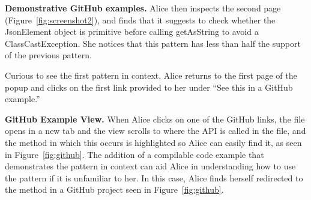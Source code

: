 {\bf Demonstrative GitHub examples.} Alice then inspects the second page (Figure~\ref{fig:screenshot2}), and finds that it suggests to check whether the {\ttt JsonElement} object is primitive before calling {\ttt getAsString} to avoid a {\ttt ClassCastException}. She notices that this pattern has less than half the support of the previous pattern.

Curious to see the first pattern in context, Alice returns to the first page of the popup and clicks on the first link provided to her under ``See this in a GitHub example.''



{\bf GitHub Example View.} When Alice clicks on one of the GitHub links, the file opens in a new tab and the view scrolls to where the API is called in the file, and the method in which this occurs is highlighted so Alice can easily find it, as seen in Figure~\ref{fig:github}. The addition of a compilable code example that demonstrates the pattern in context can aid Alice in understanding how to use the pattern if it is unfamiliar to her. In this case, Alice finds herself redirected to the method in a GitHub project seen in Figure~\ref{fig:github}.

